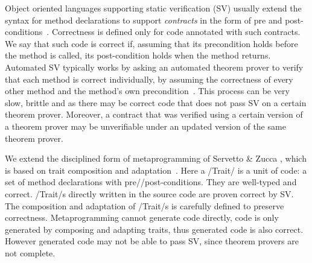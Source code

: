 \noindent Object oriented languages supporting static verification (SV) usually extend the syntax for method declarations
to support \emph{contracts} in the form of pre and post-conditions~\cite{Meyer:1988:OSC:534929}.
Correctness is defined only for code annotated with such contracts.
We say that such code is correct if, assuming that its precondition holds before the method is called, its post-condition holds when the method returns.
Automated SV typically works by asking an automated theorem prover to verify that each method is correct individually, by assuming the correctness of every other method and the method's own precondition~\cite{barnett2004spec}. This process can be very slow,  brittle and 
as there may be correct code that does not pass SV on a certain theorem prover.
Moreover, a contract that was verified
using a certain version of a theorem prover may
be unverifiable under an updated version of the same theorem prover.


We extend the disciplined form of metaprogramming of Servetto \& Zucca \cite{servetto2014meta}, which is based on trait composition and adaptation~\cite{scharli2003traits}.
Here a /Trait/ is a unit of code: a set of method declarations with pre//post-conditions.
They are well-typed and correct.
/Trait/s directly written in the source code
are proven correct by SV.
The composition and adaptation of /Trait/s is carefully defined to preserve correctness.
%
%
Metaprogramming cannot generate code directly, code is only generated by composing and adapting traits, thus generated code is also correct.
However generated code may not be able to pass SV, since theorem provers are not complete.


